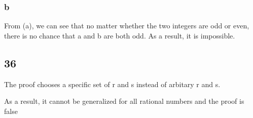 \documentclass{article}
\begin{document}
\subsubsection{b}
From (a), we can see that no matter whether the two integers are odd or even, there is no chance that a and b are both odd. As a result, it is impossible.

\subsection{36}
The proof chooses a specific set of r and s instead of arbitary r and s.

As a result, it cannot be generalized for all rational numbers and the proof is false
\end{document}
